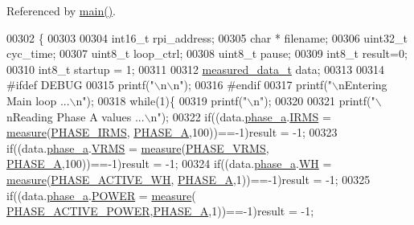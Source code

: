 Referenced by \hyperlink{a00034_source_l00198}{main()}.


\begin{DoxyCode}
00302                        \{
00303 
00304   int16\_t   rpi\_address; 
00305   \textcolor{keywordtype}{char} *    filename;
00306   uint32\_t  cyc\_time;
00307   uint8\_t   loop\_ctrl;
00308   uint8\_t   pause;
00309   int8\_t    result=0;
00310   int8\_t startup = 1;
00311   
00312     \hyperlink{a00028}{measured\_data\_t} data;
00313     
00314 \textcolor{preprocessor}{        #ifdef DEBUG }
00315 \textcolor{preprocessor}{}        printf(\textcolor{stringliteral}{"\(\backslash\)n\(\backslash\)n"});
00316 \textcolor{preprocessor}{        #endif  }
00317 \textcolor{preprocessor}{}         printf(\textcolor{stringliteral}{"\(\backslash\)nEntering Main loop ...\(\backslash\)n"});
00318          \textcolor{keywordflow}{while}(1)\{  
00319          printf(\textcolor{stringliteral}{"\(\backslash\)n"});
00320          
00321          printf(\textcolor{stringliteral}{"\(\backslash\)nReading Phase A values ...\(\backslash\)n"});   
00322          \textcolor{keywordflow}{if}((data.\hyperlink{a00028_ad7205e9853a503d2fab0697f5a301f6c}{phase\_a}.\hyperlink{a00029_a4f87f30b543e89e2e5dfa1b8f3f58eff}{IRMS}           = \hyperlink{a00008_gac914ebaa64afce03ee852af09659cf69}{measure}(\hyperlink{a00042_a15c9ccf287820001431c33c4bb25a23b}{PHASE\_IRMS},
      \hyperlink{a00042_ad214039f52b011ce2bd6c85ff98a981b}{PHASE\_A},100))==-1)result = -1;
00323          \textcolor{keywordflow}{if}((data.\hyperlink{a00028_ad7205e9853a503d2fab0697f5a301f6c}{phase\_a}.\hyperlink{a00029_a08415029e214174a01bc6487ff98ee9b}{VRMS}           = \hyperlink{a00008_gac914ebaa64afce03ee852af09659cf69}{measure}(\hyperlink{a00042_af0c09c5a455410e6fbd35fd55221338f}{PHASE\_VRMS},
      \hyperlink{a00042_ad214039f52b011ce2bd6c85ff98a981b}{PHASE\_A},100))==-1)result = -1;
00324          \textcolor{keywordflow}{if}((data.\hyperlink{a00028_ad7205e9853a503d2fab0697f5a301f6c}{phase\_a}.\hyperlink{a00029_a8dd6d8406db4e214238b3eff481e4ea0}{WH}           = \hyperlink{a00008_gac914ebaa64afce03ee852af09659cf69}{measure}(\hyperlink{a00042_a4ee773ad07fa969b9990f9bb3a1a2093}{PHASE\_ACTIVE\_WH},
      \hyperlink{a00042_ad214039f52b011ce2bd6c85ff98a981b}{PHASE\_A},1))==-1)result = -1;
00325          \textcolor{keywordflow}{if}((data.\hyperlink{a00028_ad7205e9853a503d2fab0697f5a301f6c}{phase\_a}.\hyperlink{a00029_a8a9794fa4c6a69b457d1eb04b017ef1e}{POWER}         = \hyperlink{a00008_gac914ebaa64afce03ee852af09659cf69}{measure}(
      \hyperlink{a00042_abd3f95c7cd63d0627552d293bf49e026}{PHASE\_ACTIVE\_POWER},\hyperlink{a00042_ad214039f52b011ce2bd6c85ff98a981b}{PHASE\_A},1))==-1)result = -1;

\end{DoxyCode}
